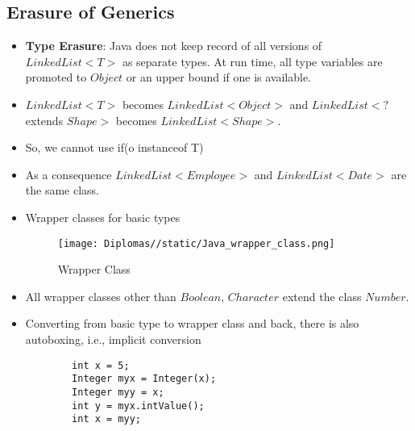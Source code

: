 \documentclass[a4paper]{article}
\begin{document}
\subsection{Erasure of Generics}
\begin{itemize}
    \item \textbf{Type Erasure}: Java does not keep record of all versions of $LinkedList<T>$ as separate types. At run time, all type variables are promoted to $Object$ or an upper bound if one is available.
    \item $LinkedList<T>$ becomes $LinkedList<Object>$ and $LinkedList<?$ extends $Shape>$ becomes $LinkedList<Shape>$.
    \item So, we cannot use if(o instanceof T)
    \item As a consequence $LinkedList<Employee>$ and $LinkedList<Date>$ are the same class.
    \item Wrapper classes for basic types
    \begin{figure}[H]
        \centering
        \texttt{[image: Diplomas//static/Java\_wrapper\_class.png]}
        \caption{Wrapper Class}
        \label{fig:Java-wrapper-class}
    \end{figure}
    \item All wrapper classes other than $Boolean$, $Character$ extend the class $Number$.
    \item Converting from basic type to wrapper class and back, there is also autoboxing, i.e., implicit conversion
    \begin{lstlisting}
        int x = 5;
        Integer myx = Integer(x);
        Integer myy = x;
        int y = myx.intValue();
        int x = myy;
    \end{lstlisting}
\end{itemize}
\end{document}

